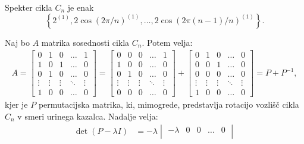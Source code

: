 \documentclass[fin1, tisk]{fmfdelo}
\begin{document}
\begin{trditev}\label{tr:cikellastne}
Spekter cikla $C_n$ je enak
\[\left\{2^{(1)}, 2\cos(2\pi/n)^{(1)}, \ldots, 2\cos(2\pi (n-1)/n)^{(1)}\right\}.\]
\end{trditev}
\begin{dokaz}
    Naj bo $A$ matrika sosednosti cikla $C_n$. Potem velja:
    \begin{align*}
        A =  \begin{bmatrix} 
            0 & 1 & 0 & \dots & 1 \\ 
            1 & 0 & 1 & \dots & 0 \\ 
            0 & 1 & 0 & \dots & 0 \\ 
            \vdots & \vdots & \vdots & \ddots & \vdots \\ 
            1 & 0 & 0 & \dots & 0 \end{bmatrix}
        =  \begin{bmatrix} 
            0 & 0 & 0 & \dots & 1 \\ 
            1 & 0 & 0 & \dots & 0 \\ 
            0 & 1 & 0 & \dots & 0 \\ 
            \vdots & \vdots & \vdots & \ddots & \vdots \\ 
            0 & 0 & 0 & \dots & 0 \end{bmatrix} 
            +
            \begin{bmatrix} 
            0 & 1 & 0 & \dots & 0 \\ 
            0 & 0 & 1 & \dots & 0 \\ 
            0 & 0 & 0 & \dots & 0 \\ 
            \vdots & \vdots & \vdots & \ddots & \vdots \\ 
            1 & 0 & 0 & \dots & 0 \end{bmatrix}
        = P + P^{-1},
    \end{align*}
    kjer je $P$ permutacijska matrika, ki, mimogrede, predstavlja rotacijo vozlišč 
    cikla $C_n$ v smeri urinega kazalca.
    Nadalje velja:
    \begin{align*}
        \det(P - \lambda I) &= -\lambda \begin{vmatrix} 
            -\lambda & 0 & 0 & \dots & 0 \\ 

\end{vmatrix}
\end{align*}
\end{dokaz}
\end{document}
